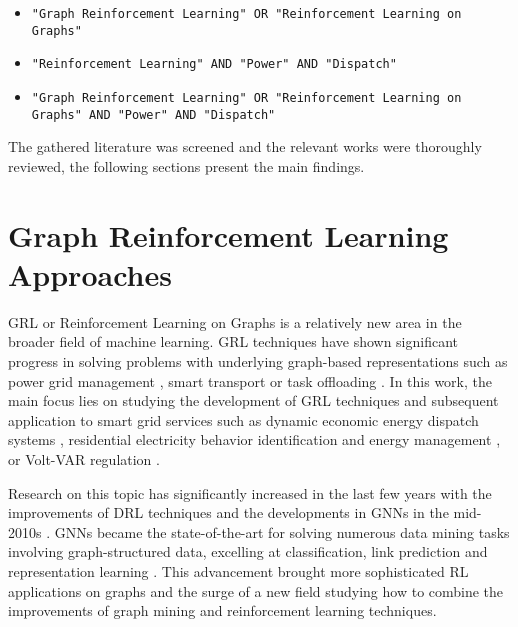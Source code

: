 \begin{itemize}
	\item \texttt{"Graph Reinforcement Learning" OR "Reinforcement Learning on Graphs"}
	\item \texttt{"Reinforcement Learning" AND "Power" AND "Dispatch"}
	\item \texttt{"Graph Reinforcement Learning" OR "Reinforcement Learning on Graphs" AND "Power" AND "Dispatch"}
\end{itemize}

 The gathered literature was screened and the relevant works were thoroughly reviewed, the following sections present the main findings.


\begin{comment}
	* Add literature histogram chart
\end{comment}



\section{Graph Reinforcement Learning Approaches}

\ac{GRL} or Reinforcement Learning on Graphs is a relatively new area in the broader field of machine learning. \ac{GRL} techniques have shown significant progress in solving problems with underlying graph-based representations such as power grid management \cite{liNovelGraphReinforcement2022, chenGraphRepresentationLearningbased2023}, smart transport \cite{xingBilevelGraphReinforcement2023, almasanDeepReinforcementLearning2022} or task offloading \cite{gaoFastAdaptiveTask2023, liGraphReinforcementLearningbased2022}. In this work, the main focus lies on studying the development of \ac{GRL} techniques and subsequent application to smart grid services such as dynamic economic energy dispatch systems \cite{chenScalableGraphReinforcement2023, xingRealtimeOptimalScheduling2023}, residential electricity behavior identification and energy management \cite{chenGraphRepresentationLearningbased2023}, or Volt-VAR regulation \cite{huMultiagentGraphReinforcement2024}.  \par
Research on this topic has significantly increased in the last few years with the improvements of \ac{DRL} techniques and the developments in \acp{GNN} in the mid-2010s \cite{kipfSemiSupervisedClassificationGraph2017, velickovicGraphAttentionNetworks2018, liGatedGraphSequence2016, gaoGraphUNets2019}. \acp{GNN} became the state-of-the-art for solving numerous data mining tasks involving graph-structured data, excelling at classification, link prediction and representation learning \cite{xuHowPowerfulAre2019, nieReinforcementLearningGraphs2023}. This advancement brought more sophisticated \ac{RL} applications on graphs and the surge of a new field studying how to combine the improvements of graph mining and reinforcement learning techniques. \par

